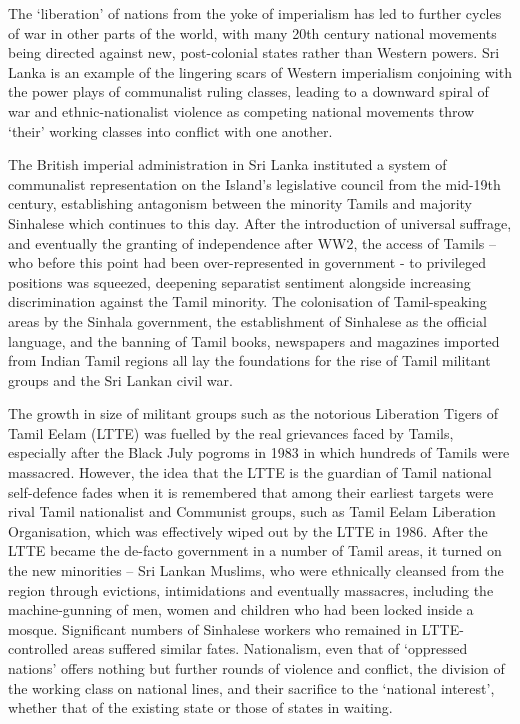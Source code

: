 The ‘liberation’ of nations from the yoke of imperialism has led to further cycles of war in other parts of the world, with many 20th century national movements being directed against new, post-colonial states rather than Western powers. Sri Lanka is an example of the lingering scars of Western imperialism conjoining with the power plays of communalist ruling classes, leading to a downward spiral of war and ethnic-nationalist violence as competing national movements throw ‘their’ working classes into conflict with one another.

The British imperial administration in Sri Lanka instituted a system of communalist representation on the Island’s legislative council from the mid-19th century, establishing antagonism between the minority Tamils and majority Sinhalese which continues to this day. After the introduction of universal suffrage, and eventually the granting of independence after WW2, the access of Tamils – who before this point had been over-represented in government - to privileged positions was squeezed, deepening separatist sentiment alongside increasing discrimination against the Tamil minority. The colonisation of Tamil-speaking areas by the Sinhala government, the establishment of Sinhalese as the official language, and the banning of Tamil books, newspapers and magazines imported from Indian Tamil regions all lay the foundations for the rise of Tamil militant groups and the Sri Lankan civil war.

The growth in size of militant groups such as the notorious Liberation Tigers of Tamil Eelam (LTTE) was fuelled by the real grievances faced by Tamils, especially after the Black July pogroms in 1983 in which hundreds of Tamils were massacred. However, the idea that the LTTE is the guardian of Tamil national self-defence fades when it is remembered that among their earliest targets were rival Tamil nationalist and Communist groups, such as Tamil Eelam Liberation Organisation, which was effectively wiped out by the LTTE in 1986. After the LTTE became the de-facto government in a number of Tamil areas, it turned on the new minorities – Sri Lankan Muslims, who were ethnically cleansed from the region through evictions, intimidations and eventually massacres, including the machine-gunning of men, women and children who had been locked inside a mosque. Significant numbers of Sinhalese workers who remained in LTTE-controlled areas suffered similar fates. Nationalism, even that of ‘oppressed nations’ offers nothing but further rounds of violence and conflict, the division of the working class on national lines, and their sacrifice to the ‘national interest’, whether that of the existing state or those of states in waiting.

